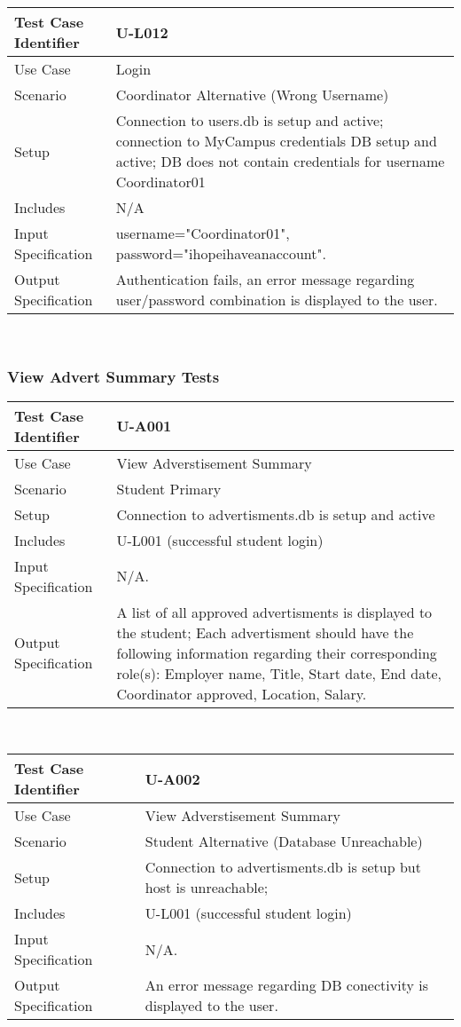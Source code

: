 \documentclass{l3deliverable}
\begin{document}
\begin{tabular}{lp{10cm}}
\hline 
\textbf{Test Case Identifier} & U-L012\tabularnewline
\hline 
\hline 
Use Case & Login \tabularnewline
\hline 
Scenario & Coordinator Alternative (Wrong Username) \tabularnewline
\hline 
Setup & Connection to users.db is setup and active; connection to MyCampus credentials DB setup and active; DB does not contain credentials for username Coordinator01 \tabularnewline
\hline 
Includes & N/A \tabularnewline
\hline 
Input Specification & username="Coordinator01", password="ihopeihaveanaccount".\tabularnewline
\hline 
Output Specification & Authentication fails, an error message regarding user/password combination is displayed to the user.\tabularnewline
\hline 
\end{tabular}\\

\subsubsection{View Advert Summary Tests}

\begin{tabular}{lp{10cm}}
\hline 
\textbf{Test Case Identifier} & U-A001\tabularnewline
\hline 
\hline 
Use Case & View Adverstisement Summary \tabularnewline
\hline 
Scenario & Student Primary \tabularnewline
\hline 
Setup & Connection to advertisments.db is setup and active \tabularnewline
\hline 
Includes &  U-L001 (successful student login) \tabularnewline
\hline 
Input Specification & N/A.\tabularnewline
\hline 
Output Specification &  A list of all approved advertisments is displayed to the student; Each advertisment should have the following information regarding their corresponding role(s): Employer name, Title, Start date, End date, Coordinator approved, Location, Salary.\tabularnewline
\hline 
\end{tabular}\\

\begin{tabular}{lp{10cm}}
\hline 
\textbf{Test Case Identifier} & U-A002\tabularnewline
\hline 
\hline 
Use Case & View Adverstisement Summary \tabularnewline
\hline 
Scenario & Student Alternative (Database Unreachable) \tabularnewline
\hline 
Setup & Connection to advertisments.db is setup but host is unreachable; \tabularnewline
\hline 
Includes &  U-L001 (successful student login) \tabularnewline
\hline 
Input Specification & N/A.\tabularnewline
\hline 
Output Specification & An error message regarding DB conectivity is displayed to the user.\tabularnewline
\hline 
\end{tabular}\\
\end{document}
